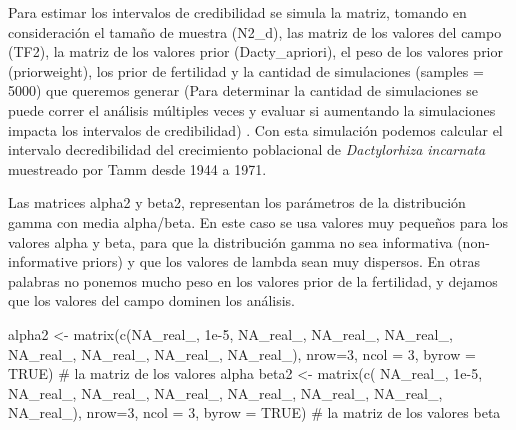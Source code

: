 \documentclass[
  12pt,
  letterpaper,
]{book}
\newenvironment{Shaded}{\begin{snugshade}}{\end{snugshade}}
\newcommand{\AttributeTok}[1]{\textcolor[rgb]{0.40,0.45,0.13}{#1}}
\newcommand{\CommentTok}[1]{\textcolor[rgb]{0.37,0.37,0.37}{#1}}
\newcommand{\ConstantTok}[1]{\textcolor[rgb]{0.56,0.35,0.01}{#1}}
\newcommand{\DecValTok}[1]{\textcolor[rgb]{0.68,0.00,0.00}{#1}}
\newcommand{\FloatTok}[1]{\textcolor[rgb]{0.68,0.00,0.00}{#1}}
\newcommand{\FunctionTok}[1]{\textcolor[rgb]{0.28,0.35,0.67}{#1}}
\newcommand{\NormalTok}[1]{\textcolor[rgb]{0.00,0.23,0.31}{#1}}
\newcommand{\OtherTok}[1]{\textcolor[rgb]{0.00,0.23,0.31}{#1}}
\begin{document}
Para estimar los intervalos de credibilidad se simula la matriz, tomando
en consideración el tamaño de muestra (N2\_d), las matriz de los valores
del campo (TF2), la matriz de los valores prior (Dacty\_apriori), el
peso de los valores prior (priorweight), los prior de fertilidad y la
cantidad de simulaciones (samples = 5000) que queremos generar (Para
determinar la cantidad de simulaciones se puede correr el análisis
múltiples veces y evaluar si aumentando la simulaciones impacta los
intervalos de credibilidad) . Con esta simulación podemos calcular el
intervalo decredibilidad del crecimiento poblacional de
\emph{Dactylorhiza incarnata} muestreado por Tamm desde 1944 a 1971.

Las matrices alpha2 y beta2, representan los parámetros de la
distribución gamma con media alpha/beta. En este caso se usa valores muy
pequeños para los valores alpha y beta, para que la distribución gamma
no sea informativa (non-informative priors) y que los valores de lambda
sean muy dispersos. En otras palabras no ponemos mucho peso en los
valores prior de la fertilidad, y dejamos que los valores del campo
dominen los análisis.

\begin{Shaded}
\begin{Highlighting}[]
\NormalTok{alpha2 }\OtherTok{\textless{}{-}} \FunctionTok{matrix}\NormalTok{(}\FunctionTok{c}\NormalTok{(}\ConstantTok{NA\_real\_}\NormalTok{, }\FloatTok{1e{-}5}\NormalTok{,     }\ConstantTok{NA\_real\_}\NormalTok{,}
                   \ConstantTok{NA\_real\_}\NormalTok{, }\ConstantTok{NA\_real\_}\NormalTok{, }\ConstantTok{NA\_real\_}\NormalTok{,}
                   \ConstantTok{NA\_real\_}\NormalTok{, }\ConstantTok{NA\_real\_}\NormalTok{, }\ConstantTok{NA\_real\_}\NormalTok{), }
          \AttributeTok{nrow=}\DecValTok{3}\NormalTok{, }\AttributeTok{ncol =} \DecValTok{3}\NormalTok{, }
          \AttributeTok{byrow =} \ConstantTok{TRUE}\NormalTok{) }\CommentTok{\# la matriz de los valores alpha}
\NormalTok{beta2 }\OtherTok{\textless{}{-}} \FunctionTok{matrix}\NormalTok{(}\FunctionTok{c}\NormalTok{( }\ConstantTok{NA\_real\_}\NormalTok{, }\FloatTok{1e{-}5}\NormalTok{,     }\ConstantTok{NA\_real\_}\NormalTok{,}
                   \ConstantTok{NA\_real\_}\NormalTok{, }\ConstantTok{NA\_real\_}\NormalTok{, }\ConstantTok{NA\_real\_}\NormalTok{,}
                   \ConstantTok{NA\_real\_}\NormalTok{, }\ConstantTok{NA\_real\_}\NormalTok{, }\ConstantTok{NA\_real\_}\NormalTok{), }
          \AttributeTok{nrow=}\DecValTok{3}\NormalTok{, }\AttributeTok{ncol =} \DecValTok{3}\NormalTok{, }
          \AttributeTok{byrow =} \ConstantTok{TRUE}\NormalTok{) }\CommentTok{\# la matriz de los valores beta}
\end{Highlighting}
\end{Shaded}
\end{document}
